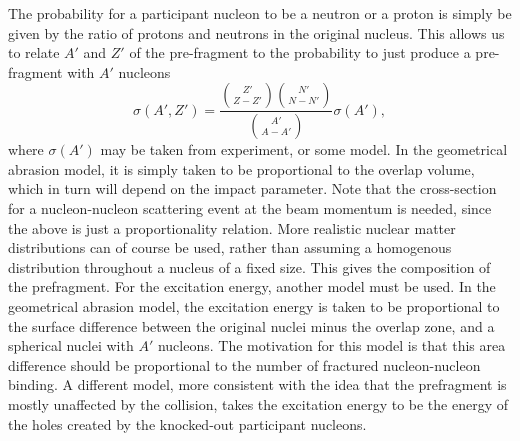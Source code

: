\documentclass[12pt, a4paper]{article}
\begin{document}
The probability for a participant nucleon to be a neutron or a proton is simply be given by the ratio of protons and neutrons in the original nucleus. This allows us to relate $A'$ and $Z'$ of the pre-fragment to the probability to just produce a pre-fragment with $A'$ nucleons
\begin{equation}
\sigma(A',Z') = \frac{\binom{Z'}{Z-Z'}\binom{N'}{N-N'}}{\binom{A'}{A-A'}}\sigma(A'),
\end{equation} 
where $\sigma(A')$ may be taken from experiment, or some model. In the geometrical abrasion model, it is simply taken to be proportional to the overlap volume, which in turn will depend on the impact parameter. Note that the cross-section for a nucleon-nucleon scattering event at the beam momentum is needed, since the above is just a proportionality relation. More realistic nuclear matter distributions can of course be used, rather than assuming a homogenous distribution throughout a nucleus of a fixed size. This gives the composition of the prefragment. For the excitation energy, another model must be used. In the geometrical abrasion model, the excitation energy is taken to be proportional to the surface difference between the original nuclei minus the overlap zone, and a spherical nuclei with $A'$ nucleons. The motivation for this model is that this area difference should be proportional to the number of fractured nucleon-nucleon binding. A different model, more consistent with the idea that the prefragment is mostly unaffected by the collision, takes the excitation energy to be the energy of the holes created by the knocked-out participant nucleons. 
\end{document}
